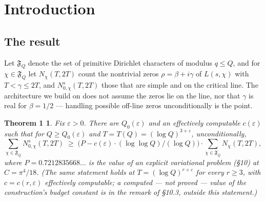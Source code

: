 \documentclass[11pt]{amsart}
\theoremstyle{plain}
\newtheorem*{theoremone}{Theorem 1}
\theoremstyle{remark}
\begin{document}
\maketitle

\section{Introduction}

\subsection{The result}

Let $\mathfrak{F}_Q$ denote the set of primitive Dirichlet characters of modulus
$q \le Q$, and for $\chi \in \mathfrak{F}_Q$ let $N_\chi(T, 2T)$ count the nontrivial
zeros $\rho = \beta + i\gamma$ of $L(s, \chi)$ with $T < \gamma \le 2T$, and
$N^{s}_{0,\chi}(T, 2T)$ those that are simple and on the critical line. The
architecture we build on does not assume the zeros lie on the line, nor that $\gamma$
is real for $\beta = 1/2$ --- handling possible off-line zeros unconditionally is the
point.

\begin{theoremone}
Fix $\varepsilon > 0$. There are $Q_0(\varepsilon)$ and an effectively computable
$c(\varepsilon)$ such that for $Q \ge Q_0(\varepsilon)$ and
$T = T(Q) = (\log Q)^{3+\varepsilon}$, unconditionally,
\[
\sum_{\chi\in\mathfrak{F}_Q} N^{s}_{0,\chi}(T, 2T)
\;\ge\; \bigl(P - c(\varepsilon)\cdot(\log \log Q)/(\log Q)\bigr)
\cdot \sum_{\chi\in\mathfrak{F}_Q} N_\chi(T, 2T),
\]
where {\boldmath$P = 0.7212835668\dots$} is the value of an explicit variational
problem (\S10) at $C = \pi^4/18$. (The same statement holds at
$T = (\log Q)^{r+\varepsilon}$ for every $r \ge 3$, with $c = c(r, \varepsilon)$
effectively computable; a computed --- not proved --- value of the construction's
budget constant is in the remark of \S10.3, outside this statement.)
\end{theoremone}
\end{document}
